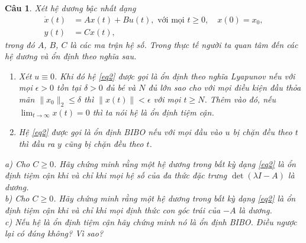 \documentclass[11pt]{article}
\newtheorem{bt}{Câu}
\begin{document}

\begin{bt}
	Xét hệ dương bậc nhất dạng
	\begin{align}\label{eq2}
		\dot{x}(t) &= A x(t) + B u(t), \mbox{ với mọi } t \geq 0, \quad x(0)=x_0, \\
		y(t) &= Cx(t),
	\end{align}
	trong đó $A$, $B$, $C$ là các ma trận hệ số. Trong thực tế người ta quan tâm đến các hệ dương và ổn định theo nghĩa sau. %
	\begin{enumerate}
		\item[i)] Xét $u \equiv 0$. Khi đó hệ \eqref{eq2} được gọi là \emph{ổn định theo nghĩa Lyapunov} nếu với mọi $\epsilon > 0$ tồn tại $\delta >0$ đủ bé và $N$ đủ lớn sao cho với mọi điều kiện đầu thỏa mãn $\|x_0\|_2 \leq \delta$ thì $\|x(t)\|<\epsilon$ với mọi $t \geq N$. Thêm vào đó, nếu $\lim_{t\rightarrow \infty} x(t) = 0 $ thì ta nói hệ là ổn định tiệm cận. 
		\item[ii)] Hệ \eqref{eq2} được gọi là \emph{ổn định BIBO} nếu với mọi đầu vào $u$ bị chặn đều theo $t$ thì đầu ra $y$ cũng bị chặn đều theo $t$.
	\end{enumerate}
	a) Cho $C \geq 0$. Hãy chứng minh rằng một hệ dương trong bất kỳ dạng \eqref{eq2} là ổn định tiệm cận khi và chỉ khi mọi hệ số của đa thức đặc trưng $\det(\lambda I-A)$ là dương. \\
	b) Cho $C \geq 0$. Hãy chứng minh rằng một hệ dương trong bất kỳ dạng \eqref{eq2} là ổn định tiệm cận khi và chỉ khi mọi định thức con góc trái của $-A$ là dương. \\
	c) Nếu hệ là ổn định tiệm cận hãy chứng minh nó là ổn định BIBO. Điều ngược lại có đúng không? Vì sao?
\end{bt}
\end{document}
